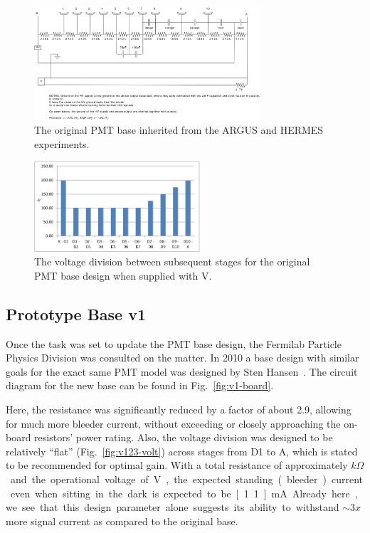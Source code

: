 \begin{figure}
	\centerline{
		\mbox{\includegraphics[width=0.75\textwidth]{figures/pmtupgrade/pmt.png}}
	}
	\caption{The original PMT base inherited from the ARGUS and HERMES experiments.}
	\label{fig:original-board}
\end{figure}

\begin{figure}
	\centerline{
		\mbox{\includegraphics[width=0.55\textwidth]{figures/pmtupgrade/original-volt.jpg}}
	}
	\caption{The voltage division between subsequent stages for the original PMT base design when supplied with \unit[-1500]{V}.}
	\label{fig:original-volt}
\end{figure}

\subsection{Prototype Base v1}

Once the task was set to update the PMT base design, the Fermilab Particle Physics Division was consulted on the matter. In 2010 a base design with similar goals for the exact same PMT model was designed by Sten Hansen~\cite{pc:sten}. The circuit diagram for the new base can be found in Fig.~\ref{fig:v1-board}.

Here, the resistance was significantly reduced by a factor of about 2.9, allowing for much more bleeder current, without exceeding or closely approaching the on-board resistors' power rating. Also, the voltage division was designed to be relatively ``flat'' (Fig.~\ref{fig:v123-volt}) across stages from D1 to A, which is stated to be recommended for optimal gain. With a total resistance of approximately \unit[1365]{$k\Omega$} and the operational voltage of \unit[-1500]{V}, the expected standing (bleeder) current even when sitting in the dark is expected to be \unit[1.1]{mA}. Already here, we see that this design parameter alone suggests its ability to withstand $\sim 3x$ more signal current as compared to the original base.

